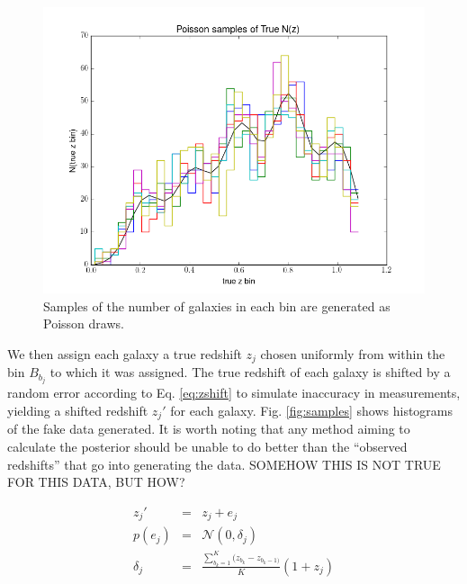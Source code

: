 \documentclass[12pt, onecolumn]{emulateapj}
\begin{document}
\begin{figure}
\label{fig:obsnz}
\includegraphics[scale=0.5]{obsNz.png}
\caption{Samples of the number of galaxies in each bin are generated as Poisson draws.}
\end{figure}

We then assign each galaxy a true redshift $z_{j}$ chosen uniformly from within the bin $B_{b_{j}}$ to which it was assigned.  The true redshift of each galaxy is shifted by a random error according to Eq. \ref{eq:zshift} to simulate inaccuracy in measurements, yielding a shifted redshift $z_{j}'$ for each galaxy.  Fig. \ref{fig:samples} shows histograms of the fake data generated.  It is worth noting that any method aiming to calculate the posterior should be unable to do better than the ``observed redshifts'' that go into generating the data.  SOMEHOW THIS IS NOT TRUE FOR THIS DATA, BUT HOW?

\begin{mathletters}
\begin{eqnarray}
\label{eq:zshift}
z_{j}' &=& z_{j}+e_{j}\\
p(e_{j}) &=& \mathcal{N}(0,\delta_{j})\nonumber\\
\delta_{j} &=& \frac{\sum_{b_{k}=1}^{K}(z_{b_{k}}-z_{b_{k}-1)}}{K}(1+z_{j})\nonumber
\end{eqnarray}
\end{mathletters}
\end{document}
